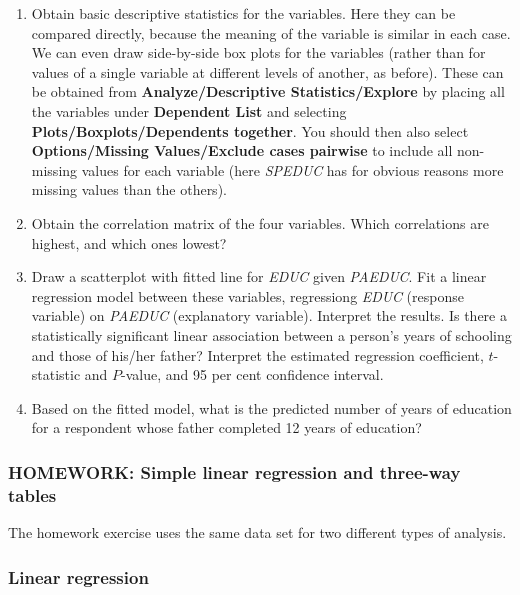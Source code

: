\documentclass[11pt,a4paper,openany]{book}
\begin{document}
\begin{enumerate}
\def\labelenumi{\arabic{enumi}.}
\item
  Obtain basic descriptive statistics for the variables. Here they can
  be compared directly, because the meaning of the variable is similar
  in each case. We can even draw side-by-side box plots for the
  variables (rather than for values of a single variable at different
  levels of another, as before). These can be obtained from
  \textbf{Analyze/Descriptive Statistics/Explore} by placing all the
  variables under \textbf{Dependent List} and selecting
  \textbf{Plots/Boxplots/Dependents together}. You should then also
  select \textbf{Options/Missing Values/Exclude cases pairwise} to
  include all non-missing values for each variable (here \emph{SPEDUC}
  has for obvious reasons more missing values than the others).
\item
  Obtain the correlation matrix of the four variables. Which
  correlations are highest, and which ones lowest?
\item
  Draw a scatterplot with fitted line for \emph{EDUC} given
  \emph{PAEDUC}. Fit a linear regression model between these variables,
  regressiong \emph{EDUC} (response variable) on \emph{PAEDUC}
  (explanatory variable). Interpret the results. Is there a
  statistically significant linear association between a person's years
  of schooling and those of his/her father? Interpret the estimated
  regression coefficient, \(t\)-statistic and \(P\)-value, and 95 per
  cent confidence interval.
\item
  Based on the fitted model, what is the predicted number of years of
  education for a respondent whose father completed 12 years of
  education?
\end{enumerate}

\subsubsection*{HOMEWORK: Simple linear regression and three-way
tables}\label{homework-simple-linear-regression-and-three-way-tables}

The homework exercise uses the same data set for two different types of
analysis.

\subsubsection*{Linear regression}\label{linear-regression}
\end{document}
